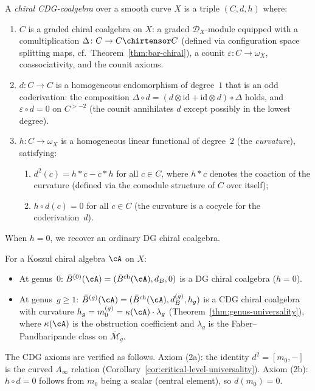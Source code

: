 \begin{definition}\label{def:chiral-CDG-coalgebra}
A \emph{chiral CDG-coalgebra} over a smooth curve $X$ is a triple
$(C, d, h)$ where:
\begin{enumerate}
\item $C$ is a graded chiral coalgebra on $X$: a graded
  $\mathcal{D}_X$-module equipped with a comultiplication
  $\Delta\colon C \to C \chirtensor C$
  (defined via configuration space splitting maps,
  cf.\ Theorem~\ref{thm:bar-chiral}),
  a counit $\varepsilon\colon C \to \omega_X$, coassociativity,
  and the counit axioms.
\item $d\colon C \to C$ is a homogeneous endomorphism of degree~$1$
  that is an odd coderivation: the composition
  $\Delta \circ d = (d \otimes \mathrm{id} +
  \mathrm{id} \otimes d) \circ \Delta$
  holds, and $\varepsilon \circ d = 0$ on $C^{>-2}$
  (the counit annihilates $d$ except possibly in the lowest degree).
\item $h\colon C \to \omega_X$ is a homogeneous linear functional
  of degree~$2$ (the \emph{curvature}), satisfying:
  \begin{enumerate}
  \item $d^2(c) = h \ast c - c \ast h$ for all $c \in C$,
    where $h \ast c$ denotes the coaction of the curvature
    (defined via the comodule structure of $C$ over itself);
  \item $h \circ d(c) = 0$ for all $c \in C$
    (the curvature is a cocycle for the coderivation~$d$).
  \end{enumerate}
\end{enumerate}
When $h = 0$, we recover an ordinary DG chiral coalgebra.
\end{definition}

\begin{example}
\label{ex:bar-as-CDG}
For a Koszul chiral algebra $\cA$ on $X$:
\begin{itemize}
\item At genus~$0$: $\bar{B}^{(0)}(\cA) = (\bar{B}^{\mathrm{ch}}(\cA), d_B, 0)$
  is a DG chiral coalgebra ($h = 0$).
\item At genus~$g \geq 1$: $\bar{B}^{(g)}(\cA) = (\bar{B}^{\mathrm{ch}}(\cA), d_B^{(g)}, h_g)$
  is a CDG chiral coalgebra with curvature
  $h_g = m_0^{(g)} = \kappa(\cA) \cdot \lambda_g$
  (Theorem~\ref{thm:genus-universality}), where $\kappa(\cA)$ is
  the obstruction coefficient and $\lambda_g$ is the Faber--Pandharipande
  class on $\overline{\mathcal{M}}_g$.
\end{itemize}
The CDG axioms are verified as follows.  Axiom (2a): the identity
$d^2 = [m_0, -]$ is the curved $A_\infty$ relation
(Corollary~\ref{cor:critical-level-universality}).
Axiom (2b): $h \circ d = 0$ follows from $m_0$ being a scalar
(central element), so $d(m_0) = 0$.
\end{example}

